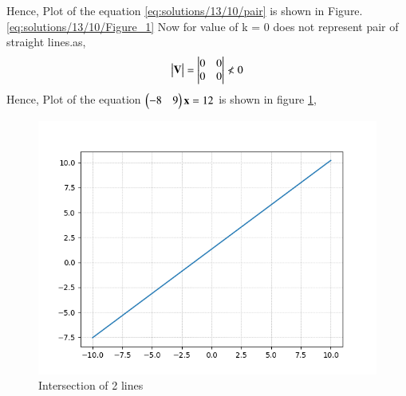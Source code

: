 Hence, Plot of the equation \eqref{eq:solutions/13/10/pair} is shown in Figure.\ref{eq:solutions/13/10/Figure_1}
Now for value of k = 0 does not represent pair of straight lines.as,
\begin{align}
\begin{vmatrix}\mathbf{V}\end{vmatrix} = \begin{vmatrix}0&0\\0&0\end{vmatrix} \nless0 
\end{align} 
Hence, Plot of the equation $\begin{pmatrix}-8&9\end{pmatrix}\mathbf{x} = 12$ is shown in figure \ref{eq:solutions/13/10/Figure_2},
\begin{figure}[ht!]
\centering
\includegraphics[width=\columnwidth]{./solutions/13/10/Figure_2.png}
\caption{Intersection of 2 lines}
\label{eq:solutions/13/10/Figure_2}
\end{figure}
